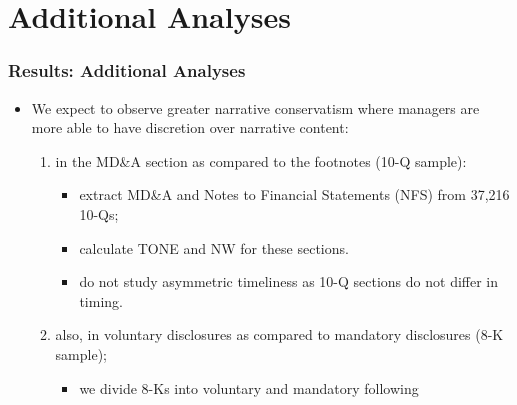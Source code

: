 \documentclass{beamer}
\begin{document}
\section{Additional Analyses}
\begin{frame}
\frametitle{Results: Additional Analyses}
\begin{itemize}
	\item We expect to observe greater narrative conservatism where managers are more able to have discretion over narrative content:
	\begin{enumerate}
		\item in the MD\&A section as compared to the footnotes (10-Q sample):
		\begin{itemize}
			\item extract MD\&A and Notes to Financial Statements (NFS) from 37,216 10-Qs;
			\item calculate TONE and NW for these sections.
			\item do not study asymmetric timeliness as 10-Q sections do not differ in timing. \pause
		\end{itemize}
		\item also, in voluntary disclosures as compared to mandatory disclosures (8-K sample);
			\begin{itemize}
	\item we divide 8-Ks into voluntary and mandatory following \cite{lermanNewForm8K2010, heMeasuringDisclosureUsing2020}
			\end{itemize}
	\end{enumerate}
\end{itemize}
\end{frame}
\end{document}
